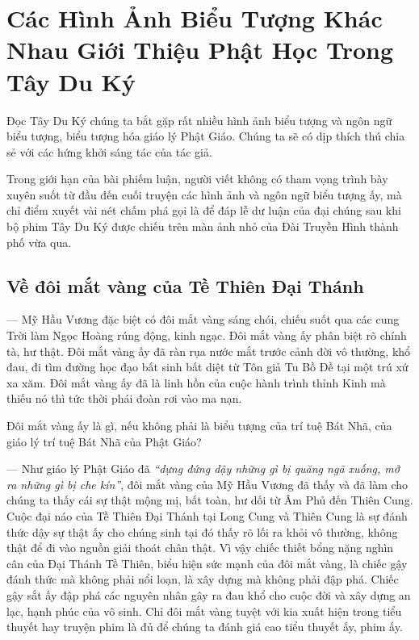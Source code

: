 \chapter{Các Hình Ảnh Biểu Tượng Khác Nhau Giới Thiệu Phật Học Trong Tây Du Ký} %
\label{cha:cac_hinh_anh_bieu_tuong_khac_nhau_gioi_thieu_phat_hoc_trong_tay_du_ky}

Đọc Tây Du Ký chúng ta bắt gặp rất nhiều hình ảnh biểu tượng và ngôn ngữ biểu tượng, biểu tượng hóa giáo lý Phật Giáo. Chúng ta sẽ có dịp thích thú chia sẻ với các hứng khởi sáng tác của tác giả.

Trong giới hạn của bài phiếm luận, người viết không có tham vọng trình bày xuyên suốt từ đầu đến cuối truyện các hình ảnh và ngôn ngữ biểu tượng ấy, mà chỉ điểm xuyết vài nét chấm phá gọi là để đáp lễ dư luận của đại chúng sau khi bộ phim Tây Du Ký được chiếu trên màn ảnh nhỏ của Đài Truyền Hình thành phố vừa qua.

\section{Về đôi mắt vàng của Tề Thiên Đại Thánh} %
\label{sec:ve_doi_mat_vang_cua_te_thien}

— Mỹ Hầu Vương đặc biệt có đôi mắt vàng sáng chói, chiếu suốt qua các cung Trời làm Ngọc Hoàng rúng động, kinh ngạc. Đôi mắt vàng ấy phân biệt rõ chính tà, hư thật. Đôi mắt vàng ấy đã ràn rụa nước mắt trước cảnh đời vô thường, khổ đau, đi tìm đường học đạo bất sinh bất diệt từ Tôn giả Tu Bồ Đề tại một trú xứ xa xăm. Đôi mắt vàng ấy đã là linh hồn của cuộc hành trình thỉnh Kinh mà thiếu nó thì tức thời phái đoàn rơi vào ma nạn.

Đôi mắt vàng ấy là gì, nếu không phải là biểu tượng của trí tuệ Bát Nhã, của giáo lý trí tuệ Bát Nhã của Phật Giáo?

— Như giáo lý Phật Giáo đã \emph{``dựng đứng dậy những gì bị quăng ngã xuống, mở ra những gì bị che kín''}, đôi mắt vàng của Mỹ Hầu Vương đã thấy và đã làm cho chúng ta thấy cái sự thật mộng mị, bất toàn, hư dối từ Âm Phủ đến Thiên Cung. Cuộc đại náo của Tề Thiên Đại Thánh tại Long Cung và Thiên Cung là sự đánh thức dậy sự thật ấy cho chúng sinh tại đó thấy rõ lối ra khỏi vô thường, không thật để đi vào nguồn giải thoát chân thật. Vì vậy chiếc thiết bổng nặng nghìn cân của Đại Thánh Tề Thiên, biểu hiện sức mạnh của đôi mắt vàng, là chiếc gậy đánh thức mà không phải nổi loạn, là xây dựng mà không phải đập phá. Chiếc gậy sắt ấy đập phá các nguyên nhân gây ra đau khổ cho cuộc đời và xây dựng an lạc, hạnh phúc của vô sinh. Chỉ đôi mắt vàng tuyệt với kia xuất hiện trong tiểu thuyết hay truyện phim là đủ để chúng ta đánh giá cao tiểu thuyết ấy, phim ấy.

